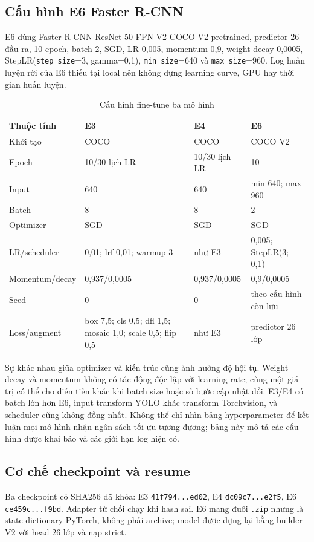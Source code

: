 \documentclass[12pt,a4paper,oneside]{report}
\begin{document}
\subsection{Cấu hình E6 Faster R-CNN}
E6 dùng Faster R-CNN ResNet-50 FPN V2 COCO V2 pretrained, predictor 26 đầu ra, 10 epoch, batch 2, SGD, LR 0,005, momentum 0,9, weight decay 0,0005, StepLR(\texttt{step\_size}=3, gamma=0,1), \texttt{min\_size}=640 và \texttt{max\_size}=960. Log huấn luyện rời của E6 thiếu tại local nên không dựng learning curve, GPU hay thời gian huấn luyện.
\begin{table}[H]\centering\small
\caption{Cấu hình fine-tune ba mô hình}\label{tab:traincfg}
\begin{tabular}{p{2.8cm}p{3.2cm}p{3.2cm}p{4.2cm}}\toprule
Thuộc tính & E3 & E4 & E6\\\midrule
Khởi tạo & COCO & COCO & COCO V2\\
Epoch & 10/30 lịch LR & 10/30 lịch LR & 10\\
Input & 640 & 640 & min 640; max 960\\
Batch & 8 & 8 & 2\\
Optimizer & SGD & SGD & SGD\\
LR/scheduler & 0,01; lrf 0,01; warmup 3 & như E3 & 0,005; StepLR(3; 0,1)\\
Momentum/decay & 0,937/0,0005 & 0,937/0,0005 & 0,9/0,0005\\
Seed & 0 & 0 & theo cấu hình còn lưu\\
Loss/augment & box 7,5; cls 0,5; dfl 1,5; mosaic 1,0; scale 0,5; flip 0,5 & như E3 & predictor 26 lớp\\
\bottomrule\end{tabular}\end{table}
Sự khác nhau giữa optimizer và kiến trúc cũng ảnh hưởng độ hội tụ. Weight decay và momentum không có tác động độc lập với learning rate; cùng một giá trị có thể cho diễn tiến khác khi batch size hoặc số bước cập nhật đổi. E3/E4 có batch lớn hơn E6, input transform YOLO khác transform Torchvision, và scheduler cũng không đồng nhất. Không thể chỉ nhìn bảng hyperparameter để kết luận mọi mô hình nhận ngân sách tối ưu tương đương; bảng này mô tả các cấu hình được khai báo và các giới hạn log hiện có.

\subsection{Cơ chế checkpoint và resume}
Ba checkpoint có SHA256 đã khóa: E3 \texttt{41f794...ed02}, E4 \texttt{dc09c7...e2f5}, E6 \texttt{ce459c...f9bd}. Adapter từ chối chạy khi hash sai. E6 mang đuôi \texttt{.zip} nhưng là state dictionary PyTorch, không phải archive; model được dựng lại bằng builder V2 với head 26 lớp và nạp strict.
\end{document}
